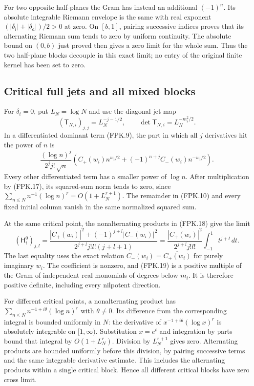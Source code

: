 \documentclass[11pt,a4paper]{article}
\begin{document}
For two opposite half-planes the Gram has instead an additional
$(-1)^n$. Its absolute integrable Riemann envelope is the same
with real exponent $(|\delta_i|+|\delta_a|)/2>0$ at zero.
On $[b,1]$, pairing successive indices proves that its alternating
Riemann sum tends to zero by uniform continuity. The absolute
bound on $(0,b)$ just proved then gives a zero limit for the whole
sum. Thus the two half-plane blocks decouple in this exact limit;
no entry of the original finite kernel has been set to zero.

\subsection{Critical full jets and all mixed blocks}

For $\delta_i=0$, put $L_N=\log N$ and use the diagonal jet map
\[
 (\mathsf T_{N,i})_{j,j}=L_N^{-j-1/2},
 \qquad \det\mathsf T_{N,i}=L_N^{-m_i^2/2}.
 \tag{FPK.17}
\]
In a differentiated dominant term (FPK.9), the part in which all
$j$ derivatives hit the power of $n$ is
\[
 \frac{(\log n)^j}{2^j j!\,\sqrt n}
       \left(C_+(w_i)n^{w_i/2}
                    +(-1)^{n+j}C_-(w_i)n^{-w_i/2}\right).
 \tag{FPK.18}
\]
Every other differentiated term has a smaller power of $\log n$.
After multiplication by (FPK.17), its squared-sum norm tends to
zero, since $\sum_{n\leq N}n^{-1}(\log n)^r
 =O(1+L_N^{r+1})$. The remainder in (FPK.10) and every fixed
initial column vanish in the same normalized squared sum.

At the same critical point, the nonalternating products in (FPK.18)
give the limit
\[
 (\mathsf H_i^0)_{j,l}
 =\frac{|C_+(w_i)|^2+(-1)^{j+l}|C_-(w_i)|^2}
            {2^{j+l}j!l!(j+l+1)}
 =\frac{|C_+(w_i)|^2}{2^{j+l}j!l!}
                    \int_{-1}^1t^{j+l}\,dt.
 \tag{FPK.19}
\]
The last equality uses the exact relation
$C_-(w_i)=\overline{C_+(w_i)}$ for purely imaginary $w_i$.
The coefficient is nonzero, and (FPK.19) is a positive multiple
of the Gram of independent real monomials of degrees below $m_i$.
It is therefore positive definite, including every nilpotent direction.

For different critical points, a nonalternating product has
$\sum_{n\leq N}n^{-1+i\theta}(\log n)^r$ with $\theta\ne0$.
Its difference from the corresponding integral is bounded uniformly
in $N$: the derivative of $x^{-1+i\theta}(\log x)^r$ is absolutely
integrable on $[1,\infty)$. Substitution $x=e^t$ and integration
by parts bound that integral by $O(1+L_N^r)$. Division by
$L_N^{r+1}$ gives zero. Alternating products are bounded uniformly
before this division, by pairing successive terms and the same
integrable derivative estimate. This includes the alternating
products within a single critical block. Hence all different critical
blocks have zero cross limit.
\end{document}
